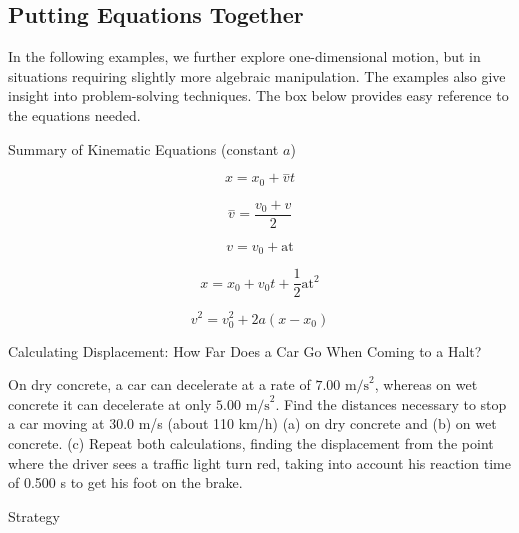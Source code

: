 \documentclass[
]{book}
\newenvironment{tinysection}{}{}
\newenvironment{note}{}{}
\begin{document}
\hypertarget{fs-id1164906446591}{}
\hypertarget{putting-equations-together}{%
\subsection{Putting Equations Together}\label{putting-equations-together}}

In the following examples, we further explore one-dimensional motion,
but in situations requiring slightly more algebraic manipulation. The
examples also give insight into problem-solving techniques. The box
below provides easy reference to the equations needed.

\hypertarget{fs-id1164906460309}{}
\begin{note}

Summary of Kinematic Equations (constant \(a{}\))

\leavevmode\hypertarget{import-auto-id1771742}{}%
\[{{x =}x_{0}{+}\overset{-}{v}t}{}\]

\leavevmode\hypertarget{import-auto-id4178996}{}%
\[{{\overset{-}{v} =}\frac{v_{0} + v}{2}}{}\]

\leavevmode\hypertarget{import-auto-id1680040}{}%
\[{v = {v_{0} + \text{at}}}{}\]

\leavevmode\hypertarget{import-auto-id1680037}{}%
\[{{x = {x_{0} + v_{0}}}{t + \frac{1}{2}}\text{at}^{2}}{}\]

\leavevmode\hypertarget{import-auto-id2178979}{}%
\[{{v^{2} = {v_{0}^{2} + 2a}}\left( {x - x_{0}} \right)}{}\]

\end{note}

\hypertarget{fs-id1164906424692}{}
Calculating Displacement: How Far Does a Car Go When Coming to a Halt?

On dry concrete, a car can decelerate at a rate of
\({7\text{.}\text{00\ m/s}^{2}}{}\), whereas on wet concrete it can
decelerate at only \({5\text{.}\text{00\ m/s}^{2}}{}\). Find the distances
necessary to stop a car moving at 30.0
m/s\emph{} (about 110 km/h) (a) on dry concrete
and (b) on wet concrete. (c) Repeat both calculations, finding the
displacement from the point where the driver sees a traffic light turn
red, taking into account his reaction time of 0.500 s to get his foot on
the brake.

\begin{tinysection}

{Strategy}

\end{tinysection}
\end{document}
